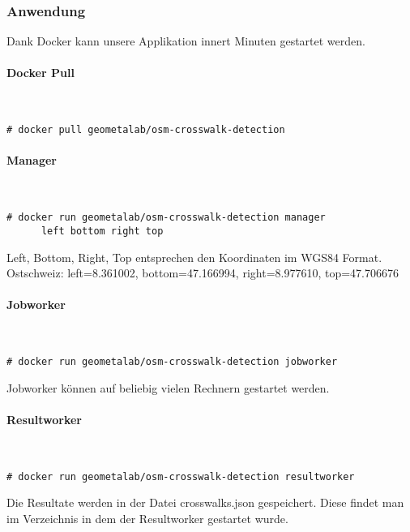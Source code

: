 \newpage
\subsubsection{Anwendung}
Dank Docker kann unsere Applikation innert Minuten gestartet werden.

\paragraph{Docker Pull}\mbox{}\\
\begin{lstlisting}[style=BashInputStyle]
	# docker pull geometalab/osm-crosswalk-detection
\end{lstlisting}

\paragraph{Manager}\mbox{}\\
\begin{lstlisting}[style=BashInputStyle]
	# docker run geometalab/osm-crosswalk-detection manager
 	  left bottom right top
\end{lstlisting}
Left, Bottom, Right, Top entsprechen den Koordinaten im WGS84 Format. \\
Ostschweiz: left=8.361002, bottom=47.166994, right=8.977610, top=47.706676

\paragraph{Jobworker}\mbox{}\\
\begin{lstlisting}[style=BashInputStyle]
	# docker run geometalab/osm-crosswalk-detection jobworker
\end{lstlisting}
Jobworker können auf beliebig vielen Rechnern gestartet werden.\\

\paragraph{Resultworker}\mbox{}\\
\begin{lstlisting}[style=BashInputStyle]
	# docker run geometalab/osm-crosswalk-detection resultworker
\end{lstlisting}
Die Resultate werden in der Datei crosswalks.json gespeichert. Diese findet man im Verzeichnis in dem der Resultworker gestartet wurde.

